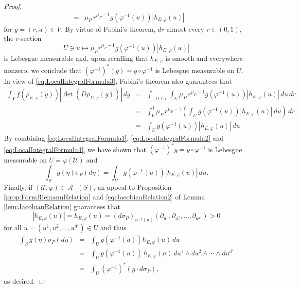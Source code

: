 \documentclass[11pt, letter]{book}
\renewcommand\det{\operatorname{det}}
\begin{document}
\begin{proof}
\begin{eqnarray}
    &=& \mu_P\,r^{\mu_P-1}g(\varphi^{-1}(u))|h_{E,\varphi}(u)|
\end{eqnarray}
for $y=(r,u)\in V$. By virtue of Fubini's theorem, $dr$-almost every $r\in (0,1)$, the $r$-section 
\begin{equation*}
    U\ni u\mapsto \mu_P r^{\mu_P-1}g(\varphi^{-1}(u))|h_{E,\varphi}(u)|
\end{equation*}
is Lebesgue measurable and,  upon recalling that $h_{E,\varphi}$ is smooth and everywhere nonzero, we conclude that $(\varphi^{-1})^*(g)=g\circ\varphi^{-1}$ is Lebesgue measurable on $U$. In view of \eqref{eq:LocalIntegralFormula3}, Fubini's theorem also guarantees that
\begin{eqnarray}\label{eq:LocalIntegralFormula4}\nonumber
    \int_V f(\rho_{E,\varphi}(y))|\det(D\rho_{E,\varphi}(y))|\,dy
    &=&\int_{(0,1)}\int_U \mu_P\, r^{\mu_P-1}g(\varphi^{-1}(u))|h_{E,\varphi}(u)|\,du\,dr\\\nonumber
    &=&\int_0^1\mu_P\, r^{\mu_P-1}\left(\int_U g(\varphi^{-1}(u))|h_{E,\varphi}(u)|\,du\right)\,dr\\
    &=&\int_U g(\varphi^{-1}(u))|h_{E,\varphi}(u)|\,du
\end{eqnarray}
By combining \eqref{eq:LocalIntegralFormula1}, \eqref{eq:LocalIntegralFormula2} and \eqref{eq:LocalIntegralFormula4}, we have shown that $(\varphi^{-1})^*g=g\circ\varphi^{-1}$ is Lebesgue measurable on $U=\varphi(\mathcal{U})$ and
\begin{equation*}
    \int_S g(\eta)\sigma_P(d\eta)=\int_U g(\varphi^{-1}(u))|h_{E,\varphi}(u)|\,du.
\end{equation*}
Finally, if $(\mathcal{U},\varphi)\in\mathcal{A}_+(S)$, an appeal to Proposition \ref{prop:FormRiemannRelation} and \eqref{eq:JacobianRelation2} of Lemma \ref{lem:JacobianRelation} guarantees that
\begin{equation*}
    |h_{E,\varphi}(u)|=h_{E,\varphi}(u)=(d\sigma_P)_{\varphi^{-1}(u)}(\partial_{u^1},\partial_{u^2},\dots,\partial_{u^{d'}})>0
\end{equation*}
for all $u=(u^1,u^2,\dots,u^{d'})\in U$ and thus
\begin{eqnarray*}
        \int_S g(\eta)\sigma_P(d\eta)&=&\int_U g(\varphi^{-1}(u))h_{E,\varphi}(u)\,du\\
        &=&\int_U g(\varphi^{-1}(u))\,h_{E,\varphi}(u)\,du^1\wedge du^2\wedge\cdots \wedge du^{d'}\\
        &=&\int_U (\varphi^{-1})^*(g\cdot d\sigma_P),
\end{eqnarray*}
as desired. 
\end{proof}
\end{document}

